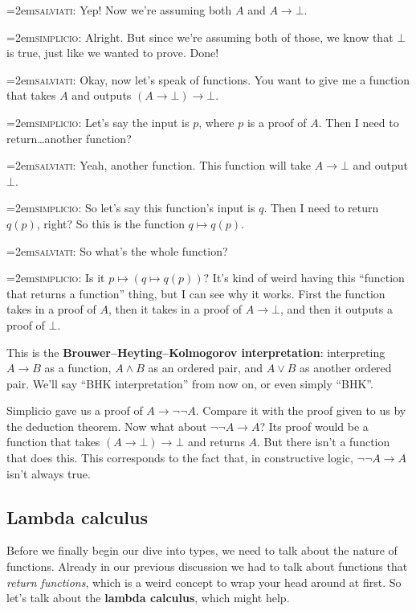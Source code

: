 \documentclass[11pt,paper=letter]{scrartcl}
\renewcommand{\land}{\wedge}
\renewcommand{\lor}{\vee}
\renewcommand{\lnot}{\neg}
\newcommand{\false}{\bot}
\newcommand{\simp}{\vspace{0.5em}\noindent\hangindent=2em\textsc{simplicio:} }
\newcommand{\salv}{\vspace{0.5em}\noindent\hangindent=2em\textsc{salviati:} }
\begin{document}
\salv Yep! Now we're assuming both $A$ and $A \to \false$.

\simp Alright. But since we're assuming both of those, we know that $\false$ is true, just like we wanted to prove. Done!

\salv Okay, now let's speak of functions. You want to give me a function that takes $A$ and outputs $(A \to \false) \to \false$.

\simp Let's say the input is $p$, where $p$ is a proof of $A$. Then I need to return\dots another function?

\salv Yeah, another function. This function will take $A \to \false$ and output $\false$.

\simp So let's say this function's input is $q$. Then I need to return $q(p)$, right? So this is the function $q \mapsto q(p)$.

\salv So what's the whole function?

\simp Is it $p \mapsto (q \mapsto q(p))$? It's kind of weird having this ``function that returns a function'' thing, but I can see why it works. First the function takes in a proof of $A$, then it takes in a proof of $A \to \false$, and then it outputs a proof of $\false$.

\vspace{0.5em}

This is the \textbf{Brouwer--Heyting--Kolmogorov interpretation}: interpreting $A \to B$ as a function, $A \land B$ as an ordered pair, and $A \lor B$ as another ordered pair. We'll say ``BHK interpretation'' from now on, or even simply ``BHK''.

Simplicio gave us a proof of $A \to \lnot\lnot A$. Compare it with the proof given to us by the deduction theorem. Now what about $\lnot\lnot A \to A$? Its proof would be a function that takes $(A \to \false) \to \false$ and returns $A$. But there isn't a function that does this. This corresponds to the fact that, in constructive logic, $\lnot\lnot A \to A$ isn't always true.

\subsection{Lambda calculus}

Before we finally begin our dive into types, we need to talk about the nature of functions. Already in our previous discussion we had to talk about functions that \emph{return functions}, which is a weird concept to wrap your head around at first. So let's talk about the \textbf{lambda calculus}, which might help.
\end{document}
